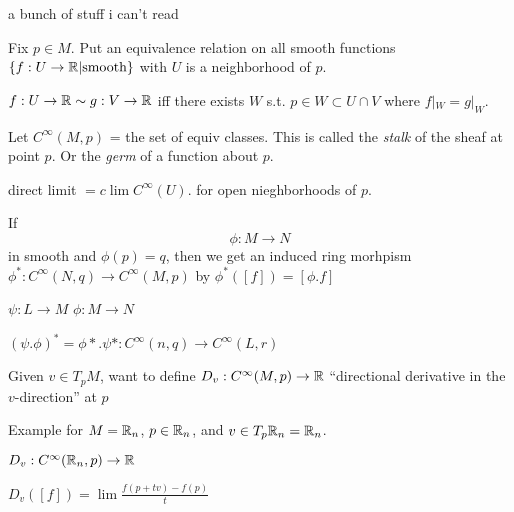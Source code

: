 \documentclass[11pt]{amsbook}
\theoremstyle{mystyle} \newtheorem{thrm}[thm]{Theorem}
\theoremstyle{mystyle} \newtheorem{defi}[thm]{Definition}
\theoremstyle{mystyle} \newtheorem{coro}[thm]{Corollary}
\theoremstyle{mystyle} \newtheorem{propo}[thm]{Proposition}
\theoremstyle{mystyle} \newtheorem{lemm}[thm]{Lemma}
\numberwithin{thm}{section}
\newcommand{\de}{\emph}
\begin{document}
a bunch of stuff i can't read

Fix $p \in M$.
Put an equivalence relation on all smooth functions $\{ f : U \to {\mathbb R} | \text{smooth}\}$
with $U$ is a neighborhood of $p$.

$f:U \to {\mathbb R} \sim g:V \to {\mathbb R}$
iff
there exists $W$ s.t. $p \in W \subset U \cap V$ where $f|_W = g|_W$.

Let $C^\infty(M,p)$ = the set of equiv classes.  This is called the \de{stalk} of the sheaf at point $p$.  Or the \de{germ} of a function about $p$.

direct limit
$= c\lim C^\infty(U)$.
for open nieghborhoods of $p$.

If $$\phi: M \to N$$ in smooth and $\phi(p) = q$, then we get an induced ring morhpism
$\phi^* : C^\infty(N,q) \to C^\infty(M,p)$ by
$\phi^*([f]) = [\phi.f]$

$\psi : L \to M$
$\phi : M \to N$

$(\psi.\phi)^* = \phi*.\psi* : C^\infty(n,q) \to C^\infty(L,r)$

Given $v \in T_pM$, want to define
$D_v : C^\infty(M,p) \to {\mathbb R}$
``directional derivative in the $v$-direction'' at $p$

Example for $M = {\mathbb R}_n$, $p \in {\mathbb R}_n$, and $v \in T_p{\mathbb R}_n = {\mathbb R}_n$.

$D_v : C^\infty({\mathbb R}_n, p) \to {\mathbb R}$

$D_v([f]) = \lim \frac{f(p + tv) - f(p)}{t}$
\end{document}
